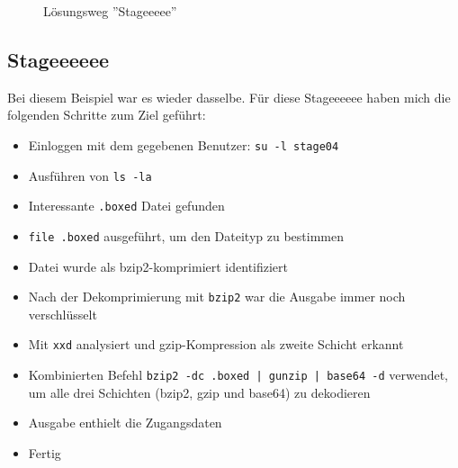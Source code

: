 \documentclass[12pt, a4paper, titlepage, oneside]{scrartcl}
\begin{document}
	\begin{figure}[h!]
		\centering
		\caption{Lösungsweg ''Stageeeee''}
		\label{fig:stageeeee_solution}
	\end{figure}

	\newpage

	\subsection{Stageeeeee}
	Bei diesem Beispiel war es wieder dasselbe. Für diese Stageeeeee haben mich
	die folgenden Schritte zum Ziel geführt:

	\begin{itemize}
		\item Einloggen mit dem gegebenen Benutzer: \lstinline{su -l stage04}

		\item Ausführen von \lstinline{ls -la}

		\item Interessante \lstinline{.boxed} Datei gefunden

		\item \lstinline{file .boxed} ausgeführt, um den Dateityp zu bestimmen

		\item Datei wurde als bzip2-komprimiert identifiziert

		\item Nach der Dekomprimierung mit \lstinline{bzip2} war die Ausgabe immer
			noch verschlüsselt

		\item Mit \lstinline{xxd} analysiert und gzip-Kompression als zweite Schicht
			erkannt

		\item Kombinierten Befehl \lstinline{bzip2 -dc .boxed | gunzip | base64 -d}
			verwendet, um alle drei Schichten (bzip2, gzip und base64) zu dekodieren

		\item Ausgabe enthielt die Zugangsdaten

		\item Fertig
	\end{itemize}
\end{document}
